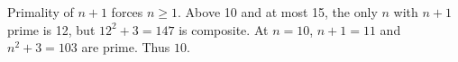 Primality of $n+1$ forces $n\ge1$. Above 10 and at most 15, the only $n$ with $n+1$ prime is 12, but $12^2+3=147$ is composite. At $n=10$, $n+1=11$ and $n^2+3=103$ are prime. Thus $\boxed{10}$.
